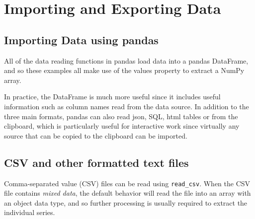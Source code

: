 \documentclass[KSmain.tex]{subfiles}
\begin{document}
 



\section{Importing and Exporting Data}

\subsection{Importing Data using pandas}


All of the data reading functions in pandas load data into a pandas
DataFrame, and so these examples all make use of the values property to extract a
NumPy array. 

In practice, the DataFrame is much more useful since it includes useful information such
as column names read from the data source. 
In addition to the three main formats, pandas can
also read json, SQL, html tables or from the clipboard, which is particularly useful for interactive work
since virtually any source that can be copied to the clipboard can be imported.

\subsection{CSV and other formatted text files}

Comma-separated value (CSV) files can be read using \texttt{read\_csv}. When the CSV file contains \textit{mixed data},
the default behavior will read the file into an array with an object data type, and so further processing is
usually required to extract the individual series.
\end{document}
